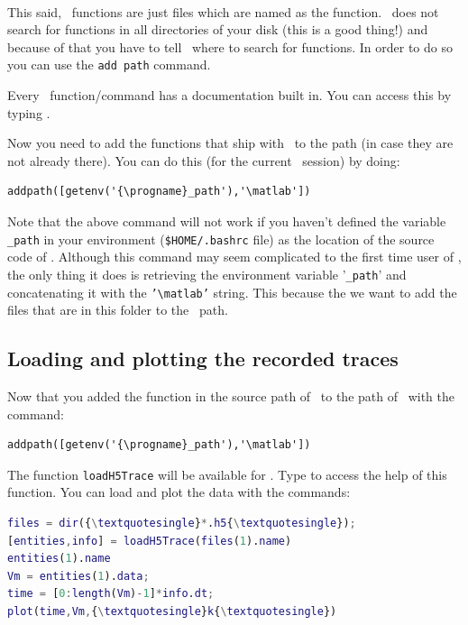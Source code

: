 \paragraph{}
This said, \matlab\ functions are just files which are named as the function. \matlab\ does not search for functions in all directories of your disk (this is a good thing!) and because of that you have to tell \matlab\ where to search for functions. In order to do so you can use the \texttt{add path} command. 

Every \matlab\ function/command has a documentation built in. You can access this by typing .

Now you need to add the functions that ship with \progname\ to the path (in case they are not already there). You can do this (for the current \matlab\ session) by doing:

\begin{lstlisting}[escapeinside=\{\}]
addpath([getenv('{\progname}_path'),'\matlab'])
\end{lstlisting}

Note that the above command will not work if you haven't defined the variable \texttt{\progname\_path} in your environment (\texttt{\$HOME/.bashrc} file) as the location of the source code of \progname. Although this command may seem complicated to the first time user of \matlab, the only thing it does is retrieving the environment variable '\texttt{\progname\_path}' and concatenating it with the \texttt{'\textbackslash matlab'} string. This because the we want to add the files that are in this folder to the \matlab\ path.

\subsection{Loading and plotting the recorded traces}

Now that you added the function in the source path of \progname\ to the path of \matlab\ with the command:

\begin{lstlisting}[escapeinside=\{\}]
addpath([getenv('{\progname}_path'),'\matlab'])
\end{lstlisting}

The function \texttt{loadH5Trace} will be available for \matlab. Type  to access the help of this function.
You can load and plot the data with the commands:

\begin{lstlisting}[language=matlab,morekeywords={loadH5Trace,ls},escapeinside=\{\}]
files = dir({\textquotesingle}*.h5{\textquotesingle});
[entities,info] = loadH5Trace(files(1).name)
entities(1).name
Vm = entities(1).data;
time = [0:length(Vm)-1]*info.dt;
plot(time,Vm,{\textquotesingle}k{\textquotesingle})
\end{lstlisting}

